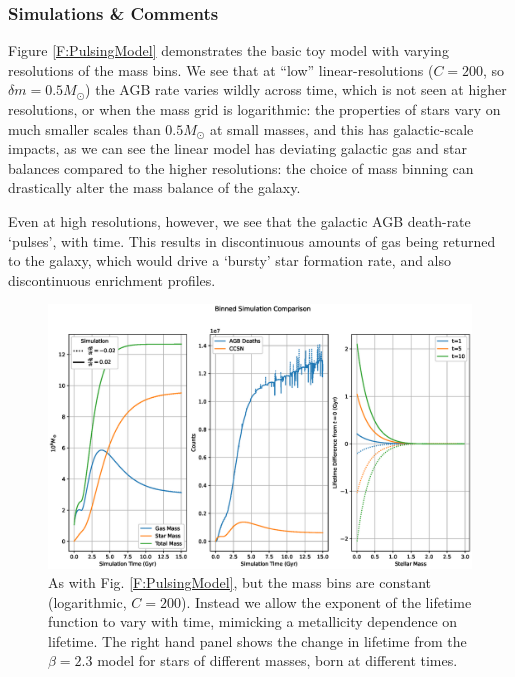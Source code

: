 \documentclass[a4paper,11pt]{article}
\begin{document}
			\subsubsection{Simulations \& Comments}

				Figure \ref{F:PulsingModel} demonstrates the basic toy model with varying resolutions of the mass bins. We see that at ``low'' linear-resolutions ($C = 200$, so $\delta m = 0.5 M_\odot$) the AGB rate varies wildly across time, which is not seen at higher resolutions, or when the mass grid is logarithmic: the properties of stars vary on much smaller scales than $0.5 M_\odot$ at small masses, and this has galactic-scale impacts, as we can see the linear model has deviating galactic gas and star balances compared to the higher resolutions: the choice of mass binning can drastically alter the mass balance of the galaxy.

				Even at high resolutions, however, we see that the galactic AGB death-rate `pulses', with time. This results in discontinuous amounts of gas being returned to the galaxy, which would drive a `bursty' star formation rate, and also discontinuous enrichment profiles.


				\begin{figure}
					\begin{center}
					\includegraphics[width=\linewidth,height=0.4\paperheight,keepaspectratio=true]{BinnedSim_Spiking.eps}
					\caption{As with Fig. \ref{F:PulsingModel}, but the mass bins are constant (logarithmic, $C = 200$). Instead we allow the exponent of the lifetime function to vary with time, mimicking a metallicity dependence on lifetime. The right hand panel shows the change in lifetime from the $\beta = 2.3$ model for stars of different masses, born at different times.}\label{F:SpikingModel}
					\end{center}
				\end{figure}
\end{document}
